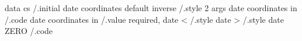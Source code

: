 data cs                               /.initial
date coordinates default inverse      /.style 2 args
date coordinates in                   /.code
date coordinates in                   /.value required,
date <                                /.style
date >                                /.style
date ZERO                             /.code

